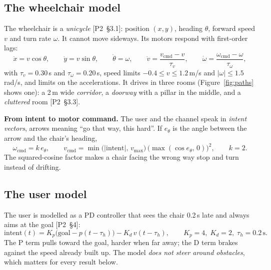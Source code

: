 \documentclass[11pt,a4paper]{article}
\newcommand{\ptwo}[1]{{\small\textsf{[P2~\S#1]}}}
\begin{document}
\subsection{The wheelchair model}
The wheelchair is a \emph{unicycle} \ptwo{3.1}: position $(x, y)$,
heading $\theta$, forward speed $v$ and turn rate $\omega$. It cannot
move sideways. Its motors respond with first-order lags:
\begin{equation}
\dot x = v\cos\theta,\qquad \dot y = v\sin\theta,\qquad \dot\theta = \omega,
\qquad
\dot v = \frac{v_{\mathrm{cmd}} - v}{\tau_v},\qquad
\dot\omega = \frac{\omega_{\mathrm{cmd}} - \omega}{\tau_\omega},
\label{eq:unicycle}
\end{equation}
with $\tau_v = 0.30$\,s and $\tau_\omega = 0.20$\,s, speed limits
$-0.4 \le v \le 1.2$\,m/s and $|\omega| \le 1.5$\,rad/s, and limits on
the accelerations. It drives in three rooms (Figure~\ref{fig:paths}
shows one): a 2\,m wide \emph{corridor}, a \emph{doorway} with a pillar
in the middle, and a \emph{cluttered} room \ptwo{3.3}.

\textbf{From intent to motor command.} The user and the channel speak in
\emph{intent vectors}, arrows meaning ``go that way, this hard''. If
$e_\theta$ is the angle between the arrow and the chair's heading,
\begin{equation}
\omega_{\mathrm{cmd}} = k\,e_\theta,\qquad
v_{\mathrm{cmd}} = \min\bigl(|\text{intent}|,\, v_{\max}\bigr)\,
\bigl(\max(\cos e_\theta,\, 0)\bigr)^{2},\qquad k = 2 .
\label{eq:intent}
\end{equation}
The squared-cosine factor makes a chair facing the wrong way stop and
turn instead of drifting.

\subsection{The user model}
The user is modelled as a PD controller that sees the chair 0.2\,s late
and always aims at the goal \ptwo{4}:
\begin{equation}
\text{intent}(t) = K_p\bigl(\text{goal} - p(t - \tau_h)\bigr) - K_d\,v(t - \tau_h),
\qquad K_p = 4,\; K_d = 2,\; \tau_h = 0.2\,\text{s}.
\label{eq:user}
\end{equation}
The P term pulls toward the goal, harder when far away; the D term
brakes against the speed already built up. The model \emph{does not
steer around obstacles}, which matters for every result below.
\end{document}
